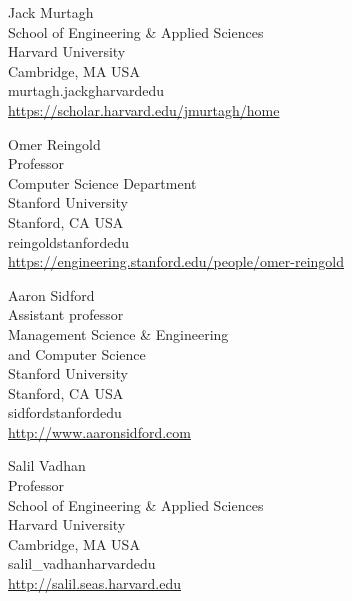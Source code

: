 \documentclass{toc}
\numberwithin{myalgctr}{section}
\theoremstyle{named}
\begin{document}
%
%
%
%
%
%
\begin{tocauthors}
\begin{tocinfo}[murtagh]
 Jack Murtagh\\
 School of Engineering \& Applied Sciences\\
Harvard University\\ 
Cambridge, MA USA\\ 
 murtagh.jack\tocat{}g\tocdot{}harvard\tocdot{}edu \\   %
 \url{https://scholar.harvard.edu/jmurtagh/home}      %
\end{tocinfo}


\begin{tocinfo}[reingold]
 Omer Reingold\\
 Professor\\
 Computer Science Department\\ 
Stanford University\\ 
 Stanford, CA USA \\
 reingold\tocat{}stanford\tocdot{}edu \\   %
 \url{https://engineering.stanford.edu/people/omer-reingold}      %
\end{tocinfo}


\begin{tocinfo}[sidford]
 Aaron Sidford\\
 Assistant professor\\
 Management Science \& Engineering\\
 and Computer Science\\  
  Stanford University \\ 
  Stanford, CA USA \\
 sidford\tocat{}stanford\tocdot{}edu  \\   %
 \url{http://www.aaronsidford.com}      %
\end{tocinfo}

\begin{tocinfo}[vadhan]
 Salil Vadhan\\
 Professor\\
 School of Engineering \& Applied Sciences\\
Harvard University\\ 
Cambridge, MA USA\\ 
 salil\_vadhan\tocat{}harvard\tocdot{}edu \\   %
 \url{http://salil.seas.harvard.edu}      %
\end{tocinfo}
\end{tocauthors}
\end{document}
